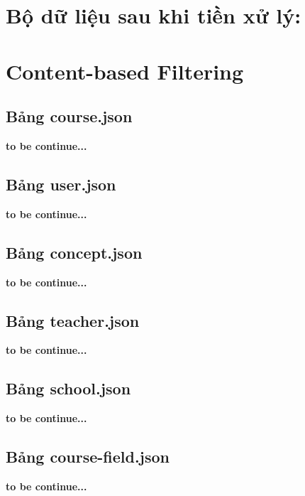 \section{Bộ dữ liệu sau khi tiền xử lý:}
\section{Content-based Filtering}
\subsection{Bảng course.json}
\textbf{to be continue...}\\
\subsection{Bảng user.json}
\textbf{to be continue...}\\
\subsection{Bảng concept.json}
\textbf{to be continue...}\\
\subsection{Bảng teacher.json}
\textbf{to be continue...}\\
\subsection{Bảng school.json}
\textbf{to be continue...}\\
\subsection{Bảng course-field.json}
\textbf{to be continue...}\\
